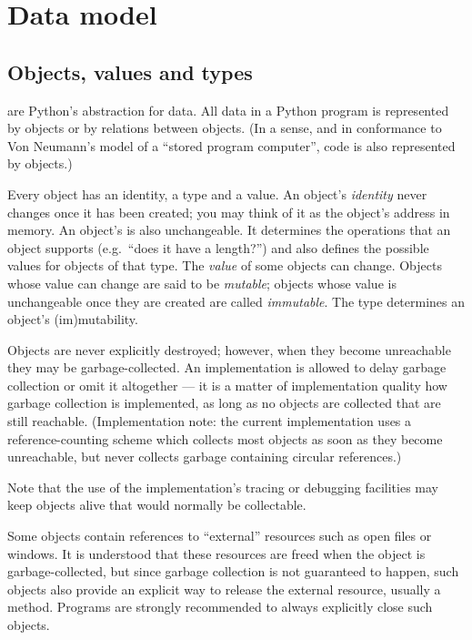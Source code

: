 \chapter{Data model}

\section{Objects, values and types}

 are Python's abstraction for data.  All data in a Python
program is represented by objects or by relations between objects.
(In a sense, and in conformance to Von Neumann's model of a
``stored program computer'', code is also represented by objects.)

Every object has an identity, a type and a value.  An object's
\emph{identity} never changes once it has been created; you may think
of it as the object's address in memory.  An object's  is
also unchangeable.  It determines the operations that an object
supports (e.g.\ ``does it have a length?'') and also defines the
possible values for objects of that type.  The \emph{value} of some
objects can change.  Objects whose value can change are said to be
\emph{mutable}; objects whose value is unchangeable once they are
created are called \emph{immutable}.  The type determines an object's
(im)mutability.

Objects are never explicitly destroyed; however, when they become
unreachable they may be garbage-collected.  An implementation is
allowed to delay garbage collection or omit it altogether --- it is a
matter of implementation quality how garbage collection is
implemented, as long as no objects are collected that are still
reachable.  (Implementation note: the current implementation uses a
reference-counting scheme which collects most objects as soon as they
become unreachable, but never collects garbage containing circular
references.)

Note that the use of the implementation's tracing or debugging
facilities may keep objects alive that would normally be collectable.

Some objects contain references to ``external'' resources such as open
files or windows.  It is understood that these resources are freed
when the object is garbage-collected, but since garbage collection is
not guaranteed to happen, such objects also provide an explicit way to
release the external resource, usually a  method.
Programs are strongly recommended to always explicitly close such
objects.

